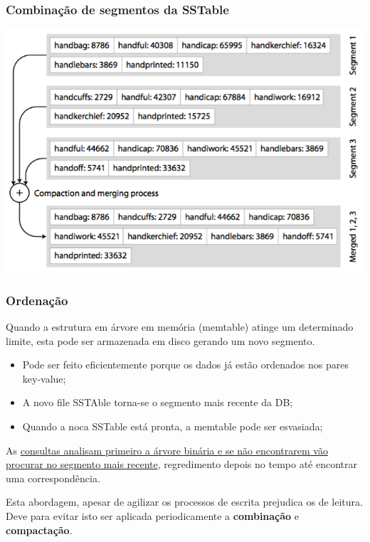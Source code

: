 \documentclass{article}
\begin{document}
\subsubsection{Combinação de segmentos da SSTable}

\begin{center}
  \includegraphics[scale=0.3]{45}
\end{center}

\subsubsection{Ordenação}

Quando a estrutura em árvore em memória (memtable) atinge um determinado limite, esta pode ser
armazenada em disco gerando um novo segmento.
\begin{itemize}
  \item Pode ser feito eficientemente porque os dados já estão ordenados nos pares key-value;
  \item A novo file SSTAble torna-se o segmento mais recente da DB;
  \item Quando a noca SSTable está pronta, a memtable pode ser esvasiada; 
\end{itemize}

\vspace{2mm}

As \uline{consultas analisam primeiro a árvore binária e se não encontrarem vão procurar no
segmento mais recente}, regredimento depois no tempo até encontrar uma correspondência.

\vspace{2mm}

Esta abordagem, apesar de agilizar os processos de escrita prejudica os de leitura. Deve para
evitar isto ser aplicada periodicamente a \textbf{combinação} e \textbf{compactação}.
\end{document}
